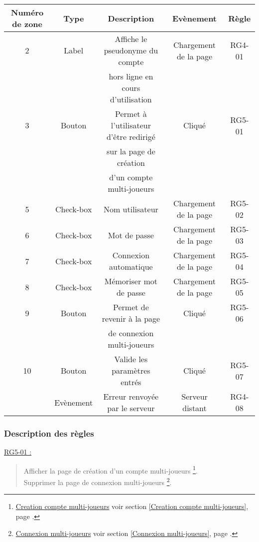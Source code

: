 \documentclass{report}
\begin{document}
			\begin{tabular}{|c|c|c|c|c|} \hline
				Numéro de zone & Type  & Description & Evènement &	Règle \\\hline
				2 & Label & Affiche le pseudonyme du compte & Chargement de la page & RG4-01 \\
				  &       & hors ligne en cours d'utilisation & & \\\hline
				3 & Bouton & Permet à l'utilisateur d'être redirigé & Cliqué & RG5-01\\
				  &        & sur la page de création  & & \\
				  &        & d'un compte multi-joueurs \footnotemark[1] & & \\\hline
				5 & Check-box & Nom utilisateur & Chargement de la page & RG5-02 \\\hline 
				6 & Check-box & Mot de passe & Chargement de la page & RG5-03 \\\hline 
				7 & Check-box & Connexion automatique & Chargement de la page & RG5-04 \\\hline 
				8 & Check-box & Mémoriser mot de passe & Chargement de la page & RG5-05 \\\hline 
				9 & Bouton & Permet de revenir à la page & Cliqué & RG5-06 \\
				  &        & de connexion multi-joueurs \footnotemark[2] & & \\\hline
				10 & Bouton & Valide les paramètres entrés & Cliqué & RG5-07 \\\hline
				  & Evènement & Erreur renvoyée par le serveur & Serveur distant & RG4-08 \\\hline
			\end{tabular}

		\subsubsection{Description des règles}

			\underline{RG5-01 :}
				\begin{quote}
					Afficher la page de création d'un compte multi-joueurs%
						\footnote[1]{
							\hyperlink{Creation compte multi-joueurs}{Creation compte multi-joueurs}
							\og voir section \ref{Creation compte multi-joueurs}, page \pageref{Creation compte multi-joueurs}.\fg
						}.\\
					Supprimer la page de connexion multi-joueurs%
						\footnote[2]{
							\hyperlink{Connexion multi-joueurs}{Connexion multi-joueurs}
							\og voir section \ref{Connexion multi-joueurs}, page \pageref{Connexion multi-joueurs}.\fg
						}.
				\end{quote}	
\end{document}
